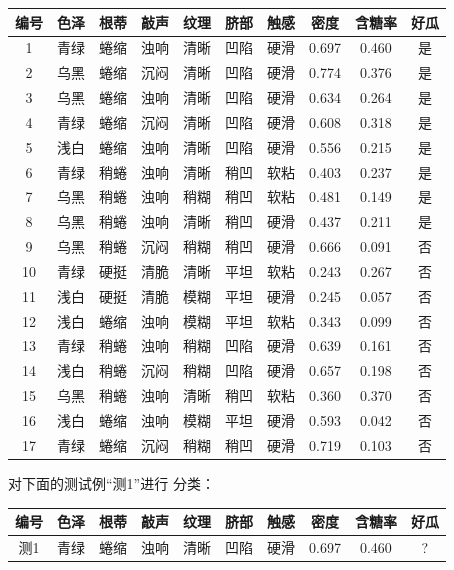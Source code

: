 \begin{table}[h]
	\centering
	\begin{tabular}{|c|c|c|c|c|c|c|c|c|c|}\hline
		编号 & 色泽 & 根蒂 & 敲声 & 纹理 & 脐部 & 触感 & 密度  & 含糖率 & 好瓜 \\\hline
		1   & 青绿 & 蜷缩 & 浊响 & 清晰 & 凹陷 & 硬滑 & 0.697 & 0.460  &  是 \\\hline 
		2   & 乌黑 & 蜷缩 & 沉闷 & 清晰 & 凹陷 & 硬滑 & 0.774 & 0.376  &  是 \\\hline 
		3   & 乌黑 & 蜷缩 & 浊响 & 清晰 & 凹陷 & 硬滑 & 0.634 & 0.264  &  是 \\\hline 
		4   & 青绿 & 蜷缩 & 沉闷 & 清晰 & 凹陷 & 硬滑 & 0.608 & 0.318  &  是 \\\hline 
		5   & 浅白 & 蜷缩 & 浊响 & 清晰 & 凹陷 & 硬滑 & 0.556 & 0.215  &  是 \\\hline 
		6   & 青绿 & 稍蜷 & 浊响 & 清晰 & 稍凹 & 软粘 & 0.403 & 0.237  &  是 \\\hline 
		7   & 乌黑 & 稍蜷 & 浊响 & 稍糊 & 稍凹 & 软粘 & 0.481 & 0.149  &  是 \\\hline 
		8   & 乌黑 & 稍蜷 & 浊响 & 清晰 & 稍凹 & 硬滑 & 0.437 & 0.211  &  是 \\\hline 
		9   & 乌黑 & 稍蜷 & 沉闷 & 稍糊 & 稍凹 & 硬滑 & 0.666 & 0.091  &  否 \\\hline 
		10  & 青绿 & 硬挺 & 清脆 & 清晰 & 平坦 & 软粘 & 0.243 & 0.267  &  否 \\\hline 
		11  & 浅白 & 硬挺 & 清脆 & 模糊 & 平坦 & 硬滑 & 0.245 & 0.057  &  否 \\\hline 
		12  & 浅白 & 蜷缩 & 浊响 & 模糊 & 平坦 & 软粘 & 0.343 & 0.099  &  否 \\\hline 
		13  & 青绿 & 稍蜷 & 浊响 & 稍糊 & 凹陷 & 硬滑 & 0.639 & 0.161  &  否 \\\hline 
		14  & 浅白 & 稍蜷 & 沉闷 & 稍糊 & 凹陷 & 硬滑 & 0.657 & 0.198  &  否 \\\hline 
		15  & 乌黑 & 稍蜷 & 浊响 & 清晰 & 稍凹 & 软粘 & 0.360 & 0.370  &  否 \\\hline 
		16  & 浅白 & 蜷缩 & 浊响 & 模糊 & 平坦 & 硬滑 & 0.593 & 0.042  &  否 \\\hline 
		17  & 青绿 & 蜷缩 & 沉闷 & 稍糊 & 稍凹 & 硬滑 & 0.719 & 0.103  &  否 \\\hline 
	\end{tabular}
\end{table}


对下面的测试例“测1”进行 分类：

\begin{table}[h]
	\centering
	\begin{tabular}{|c|c|c|c|c|c|c|c|c|c|}\hline
 编号 & 色泽 & 根蒂 & 敲声 & 纹理 & 脐部 & 触感 & 密度  & 含糖率 & 好瓜\\\hline 
 测1  & 青绿 & 蜷缩 & 浊响 & 清晰 & 凹陷 & 硬滑 & 0.697 & 0.460  &  ?  \\\hline 
	\end{tabular}
\end{table}

